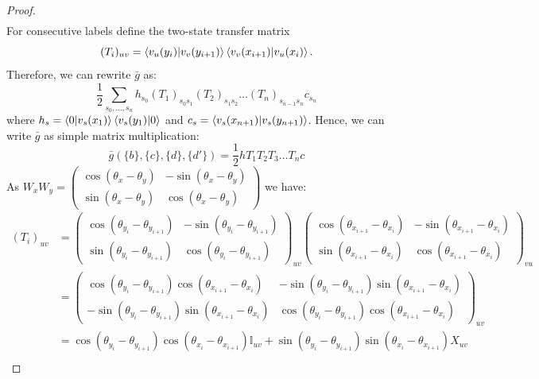 \documentclass[aps,floatfix,10pt,amssymb,amsfont,amsmath,superscriptaddress,float,nofootinbib,longbibliography,nobalancelastpage,twocolumn]{revtex4-2}
\begin{document}
\begin{widetext}
\begin{proof}
\begin{multline}
\end{multline}
For consecutive labels define
the two-state transfer matrix
\begin{equation*}
    (T_i)_{uv}=\braket{v_u(y_i)|v_v(y_{i+1})}
    \braket{v_v(x_{i+1})|v_u(x_i)}.
\end{equation*}
Therefore, we can rewrite $\bar g$ as:
\begin{equation}
   \frac{1}{2}\sum_{s_0,\ldots,s_n} h_{s_0}(T_1)_{s_0s_1}(T_2)_{s_1s_2}\ldots (T_n)_{s_{n-1}s_{n}} c_{s_n}
\end{equation}
where $h_s = \braket{0|v_{s}(x_1)}\braket{v_{s}(y_1)|0}$ and $c_s =\braket{v_{s}(x_{n+1})|v_{s}(y_{n+1})}$. Hence, we can write $\bar g$ as simple matrix multiplication:
\begin{equation}
    \bar g(\{b\},\{c\},\{d\},\{d'\}) = \frac{1}{2}hT_1T_2T_3\ldots T_nc
\end{equation}
As $W_xW_y = \begin{pmatrix}
    \cos (\theta_x - \theta_y) & - \sin (\theta_x - \theta_y)\\
     \sin (\theta_x - \theta_y) & \cos (\theta_x - \theta_y)
\end{pmatrix}$ we have:
\begin{align}
    (T_i)_{u v} &=  \begin{pmatrix}
    \cos (\theta_{y_i} - \theta_{y_{i+1}}) & - \sin (\theta_{y_i} - \theta_{y_{i+1}})\\
     \sin (\theta_{y_i} - \theta_{y_{i+1}}) & \cos (\theta_{y_i} - \theta_{y_{i+1}})
\end{pmatrix}_{uv} \begin{pmatrix}
    \cos (\theta_{x_{i+1}} - \theta_{x_{i}}) & - \sin (\theta_{x_{i+1}} - \theta_{x_{i}})\\
     \sin (\theta_{x_{i+1}} - \theta_{x_{i}}) & \cos (\theta_{x_{i+1}} - \theta_{x_{i}}) 
\end{pmatrix}_{vu}\\
&=\begin{pmatrix}
    \cos (\theta_{y_i} - \theta_{y_{i+1}})\cos (\theta_{x_{i+1}} - \theta_{x_{i}}) & - \sin (\theta_{y_i} - \theta_{y_{i+1}})\sin (\theta_{x_{i+1}} - \theta_{x_{i}})\\
     -\sin (\theta_{y_i} - \theta_{y_{i+1}})\sin (\theta_{x_{i+1}} - \theta_{x_{i}}) & \cos (\theta_{y_i} - \theta_{y_{i+1}}) \cos (\theta_{x_{i+1}} - \theta_{x_{i}}) 
\end{pmatrix}_{uv}\\
&=  \cos (\theta_{y_i} - \theta_{y_{i+1}})\cos (\theta_{x_{i}} - \theta_{x_{i+1}}) \mathbb{I}_{uv} + \sin (\theta_{y_i} - \theta_{y_{i+1}})\sin (\theta_{x_{i}} - \theta_{x_{i+1}}) X_{uv}\\

\end{align}
\end{proof}
\end{widetext}
\end{document}
